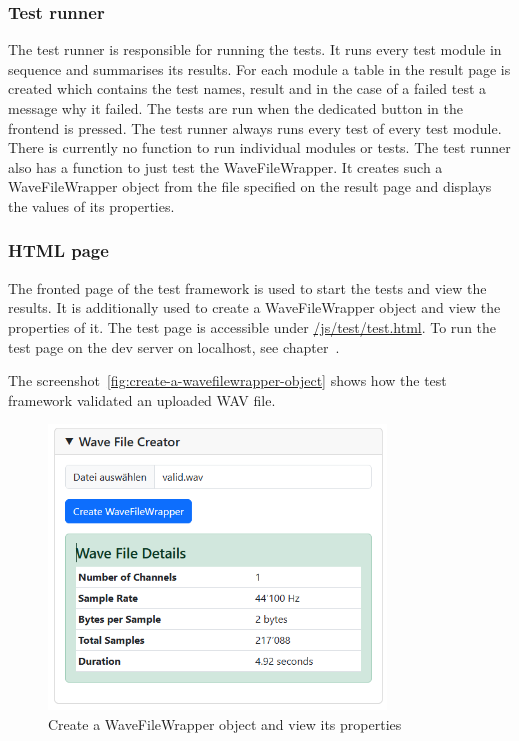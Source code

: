 \subsubsection{Test runner}
The test runner is responsible for running the tests.
It runs every test module in sequence and summarises its results.
For each module a table in the result page is created which contains the test names, result and in the case of a failed test a message why it failed.
The tests are run when the dedicated button in the frontend is pressed.
The test runner always runs every test of every test module.
There is currently no function to run individual modules or tests.
The test runner also has a function to just test the WaveFileWrapper.
It creates such a WaveFileWrapper object from the file specified on the result page and displays the values of its properties.

\subsubsection{HTML page}
The fronted page of the test framework is used to start the tests and view the results.
It is additionally used to create a WaveFileWrapper object and view the properties of it.
The test page is accessible under \href{https://decibel-threshold-event-displayer.github.io/js/test/test.html}{/js/test/test.html}.
To run the test page on the dev server on localhost, see chapter~.

The screenshot~\autoref{fig:create-a-wavefilewrapper-object} shows how the test framework validated an uploaded WAV file.
\begin{figure}[H]
    \centering
    \includegraphics[width=0.8\textwidth]{../assets/wavefilecreator.png}
    \caption{Create a WaveFileWrapper object and view its properties}\label{fig:create-a-wavefilewrapper-object}
\end{figure}

